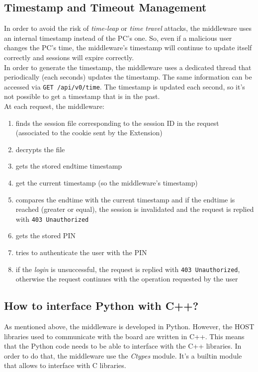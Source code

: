 \subsection{Timestamp and Timeout Management}
In order to avoid the risk of \textit{time-leap} or \textit{time travel} attacks, the middleware uses an internal timestamp instead of the PC's one. So, even if a malicious user changes the PC's time, the middleware's timestamp will continue to update itself correctly and sessions will expire correctly.\\

In order to generate the timestamp, the middleware uses a dedicated thread that periodically (each seconds) updates the timestamp. The same information can be accessed via \texttt{GET /api/v0/time}. The timestamp is updated each second, so it's not possible to get a timestamp that is in the past.\\

At each request, the middleware:

\begin{enumerate}
    \item finds the session file corresponding to the session ID in the request (associated to the cookie sent by the Extension)
    \item decrypts the file
    \item gets the stored endtime timestamp
    \item get the current timestamp (so the middleware's timestamp)
    \item compares the endtime with the current timestamp and if the endtime is reached (greater or equal), the session is invalidated and the request is replied with \texttt{403 Unauthorized}
    \item gets the stored PIN
    \item tries to authenticate the user with the PIN
    \item if the \textit{login} is unsuccessful, the request is replied with \texttt{403 Unauthorized}, otherwise the request continues with the operation requested by the user 
\end{enumerate}

\subsection{How to interface Python with C++?}
As mentioned above, the middleware is developed in Python. However, the HOST libraries used to communicate with the board are written in C++. This means that the Python code needs to be able to interface with the C++ libraries. In order to do that, the middleware use the \textit{Ctypes} module. It's a builtin module that allows to interface with C libraries.\\

